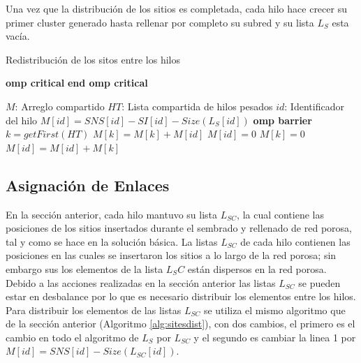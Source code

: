 Una vez que la distribución de los sitios es completada, cada hilo hace crecer su primer cluster generado hasta rellenar por completo su subred y su lista $L_S$ esta vacía.
 
\begin{algorithm}
\caption{Redistribución de los sitos entre los hilos}\label{alg:sitesdist}
\begin{algorithmic}[1]
    {\textbf{omp critical}}
    {\textbf{end omp critical}}
    
\Require $M$: Arreglo compartido
\Require $HT$: Lista compartida de hilos pesados
\Require $id$: Identificador del hilo
\State $M[id]=SNS[id]-SI[id]-Size(L_S[id])$
	\ompcritical
		\State {}
	\eompcritical
\EndIf
\State \textbf{omp barrier}
	\ompcritical
			\State $k=getFirst(HT)$
				\State {}
				\State $M[k]=M[k]+M[id]$
				\State $M[id]=0$
			\Else
				\State {}
				\State $M[k]=0$
				\State $M[id]=M[id]+M[k]$
				\State {}	
			\EndIf
		\EndWhile
	\eompcritical
\EndIf
\end{algorithmic}
\end{algorithm}

\subsection{Asignación de Enlaces}
\label{subsec:pbond}
En la sección anterior, cada hilo mantuvo su lista $L_{SC}$, la cual contiene las posiciones de los sitios insertados durante el sembrado y rellenado de red porosa, tal y como se hace en la solución básica. La listas $L_{SC}$ de cada hilo contienen las posiciones en las cuales se insertaron los sitios a lo largo de la red porosa; sin embargo sus los elementos de la lista $L_SC$ están dispersos en la red porosa.\\

Debido a las acciones realizadas en la sección anterior las listas $L_{SC}$ se pueden estar en desbalance por lo que es necesario distribuir los elementos entre los hilos. Para distribuir los elementos de las listas $L_{SC}$ se utiliza el mismo algoritmo que de la sección anterior (Algoritmo \ref{alg:sitesdist}), con dos cambios, el primero es el cambio en todo el algoritmo de $L_S$ por $L_{SC}$ y el segundo es cambiar la linea 1 por $M[id]=SNS[id]-Size(L_{SC}[id])$.\\

